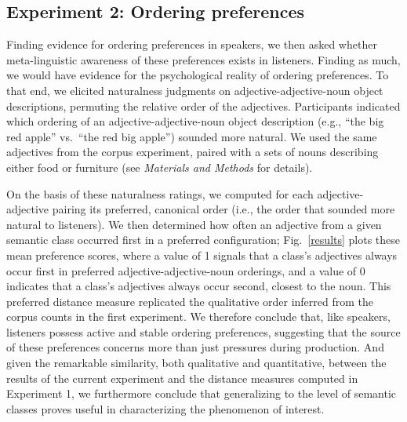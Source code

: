 \documentclass{pnastwo}
\begin{document}
\begin{article}
\section{Experiment 2: Ordering preferences}
Finding evidence for ordering preferences in speakers, we then asked whether meta-linguistic awareness of these preferences exists in listeners. Finding as much, we would have evidence for the psychological reality of ordering preferences. To that end, we elicited naturalness judgments on adjective-adjective-noun object descriptions, permuting the relative order of the adjectives. Participants indicated which ordering of an adjective-adjective-noun object description (e.g., ``the big red apple'' vs.\ ``the red big apple'') sounded more natural. We used the same adjectives from the corpus experiment, paired with a sets of nouns describing either food or furniture (see \emph{Materials and Methods} for details).

On the basis of these naturalness ratings, we computed for each adjective-adjective pairing its preferred, canonical order (i.e., the order that sounded more natural to listeners). We then determined how often an adjective from a given semantic class occurred first in a preferred  configuration; Fig.\ \ref{results} plots these mean preference scores, where a value of 1 signals that a class's adjectives always occur first in preferred adjective-adjective-noun orderings, and a value of 0 indicates that a class's adjectives always occur second, closest to the noun. This preferred distance measure replicated the qualitative order inferred from the corpus counts in the first experiment. We therefore conclude that, like speakers, listeners possess active and stable ordering preferences, suggesting that the source of these preferences concerns more than just pressures during production. And given the remarkable similarity, both qualitative and quantitative, between the results of the current experiment and the distance measures computed in Experiment 1, we furthermore conclude that generalizing to the level of semantic classes proves useful in characterizing the phenomenon of interest.


\end{article}
\end{document}
